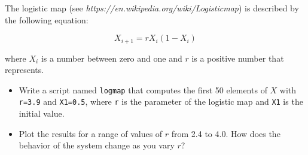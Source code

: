 \begin{ex}
The logistic map (see \emph{https://en.wikipedia.org/wiki/Logistic\textunderscore map}) is described by the following equation:


\begin{equation}
X_{i+1} = r X_i (1-X_i)
\end{equation}

where $X_i$ is a number between zero and one and $r$ is a positive number that represents.

\begin{itemize}

\item Write a script named {\tt logmap} that computes the first 50
elements of $X$ with {\tt r=3.9} and {\tt X1=0.5}, where
{\tt r} is the parameter of the logistic map and {\tt X1} is the
initial value.

\item Plot the results for a range of values of $r$ from 2.4 to 4.0.
How does the behavior of the system change as you vary $r$?

\end{itemize}

\end{ex}


